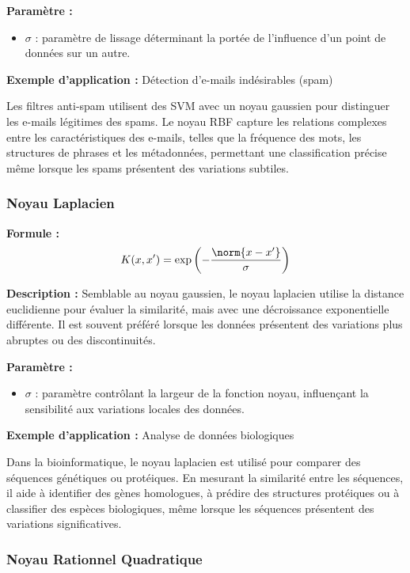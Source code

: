 \textbf{Paramètre :}
\begin{itemize}
\item $\sigma$ : paramètre de lissage déterminant la portée de l'influence d'un point de données sur un autre.
\end{itemize}

\textbf{Exemple d'application :} Détection d'e-mails indésirables (spam)

Les filtres anti-spam utilisent des SVM avec un noyau gaussien pour distinguer les e-mails légitimes des spams. Le noyau RBF capture les relations complexes entre les caractéristiques des e-mails, telles que la fréquence des mots, les structures de phrases et les métadonnées, permettant une classification précise même lorsque les spams présentent des variations subtiles.

\subsubsection{Noyau Laplacien}

\textbf{Formule :}
\begin{equation}
K(x, x') = \exp\left(-\frac{\norm{x - x'}}{\sigma}\right)
\label{eq:noyau_laplacien}
\end{equation}

\textbf{Description :} Semblable au noyau gaussien, le noyau laplacien utilise la distance euclidienne pour évaluer la similarité, mais avec une décroissance exponentielle différente. Il est souvent préféré lorsque les données présentent des variations plus abruptes ou des discontinuités.

\textbf{Paramètre :}
\begin{itemize}
\item $\sigma$ : paramètre contrôlant la largeur de la fonction noyau, influençant la sensibilité aux variations locales des données.
\end{itemize}

\textbf{Exemple d'application :} Analyse de données biologiques

Dans la bioinformatique, le noyau laplacien est utilisé pour comparer des séquences génétiques ou protéiques. En mesurant la similarité entre les séquences, il aide à identifier des gènes homologues, à prédire des structures protéiques ou à classifier des espèces biologiques, même lorsque les séquences présentent des variations significatives.

\subsubsection{Noyau Rationnel Quadratique}


